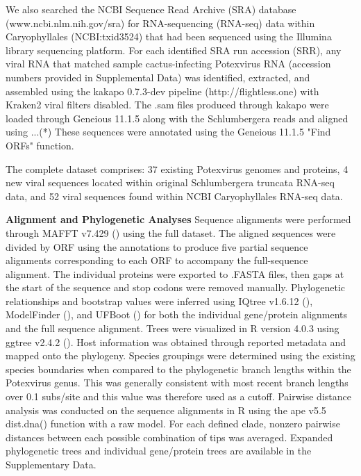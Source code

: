 \documentclass{article}
\begin{document}
We also searched the NCBI Sequence Read Archive (SRA) database (www.ncbi.nlm.nih.gov/sra) for RNA-sequencing (RNA-seq) data within Caryophyllales (NCBI:txid3524) that had been sequenced using the Illumina library sequencing platform. For each identified SRA run accession (SRR), any viral RNA that matched sample cactus-infecting Potexvirus RNA (accession numbers provided in Supplemental Data) was identified, extracted, and assembled using the kakapo 0.7.3-dev pipeline (http://flightless.one) with Kraken2 viral filters disabled. The .sam files produced through kakapo were loaded through Geneious 11.1.5 along with the Schlumbergera reads and aligned using ...(*)
These sequences were annotated using the Geneious 11.1.5 "Find ORFs" function. 

The complete dataset comprises: 37 existing Potexvirus genomes and proteins, 4 new viral sequences located within original Schlumbergera truncata RNA-seq data, and 52 viral sequences found within NCBI Caryophyllales RNA-seq data.


\textbf{Alignment and Phylogenetic Analyses}
Sequence alignments were performed through MAFFT v7.429 (\cite{katoh_mafft_2002}) using the full dataset.
The aligned sequences were divided by ORF using the annotations to produce five partial sequence alignments corresponding to each ORF to accompany the full-sequence alignment. The individual proteins were exported to .FASTA files, then gaps at the start of the sequence and stop codons were removed manually. Phylogenetic relationships and bootstrap values were inferred using IQtree v1.6.12 (\cite{nguyen_iq-tree_2015}), ModelFinder (\cite{kalyaanamoorthy_modelfinder_2017}), and UFBoot (\cite{hoang_ufboot2_2018}) for both the individual gene/protein alignments and the full sequence alignment. Trees were visualized in R version 4.0.3 using ggtree v2.4.2 (\cite{yu_span_2017}). Host information was obtained through reported metadata and mapped onto the phylogeny. Species groupings were determined using the existing species boundaries when compared to the phylogenetic branch lengths within the Potexvirus genus. This was generally consistent with most recent branch lengths over 0.1 subs/site and this value was therefore used as a cutoff. Pairwise distance analysis was conducted on the sequence alignments in R using the ape v5.5  dist.dna() function with a raw model. For each defined clade, nonzero pairwise distances between each possible combination of tips was averaged. Expanded phylogenetic trees and individual gene/protein trees are available in the Supplementary Data.
\end{document}

